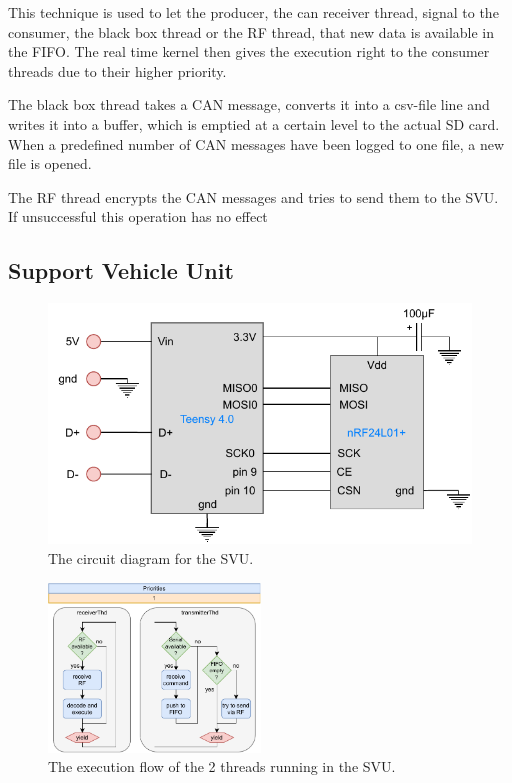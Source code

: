 \documentclass[conference]{IEEEtran}
\begin{document}
This technique is used to let the producer, the can receiver thread, signal to the consumer, the black box thread or the RF thread, that new data is available in the FIFO. The real time kernel then gives the execution right to the consumer threads due to their higher priority.

The black box thread takes a CAN message, converts it into a csv-file line and writes it into a buffer, which is emptied at a certain level to the actual SD card. When a predefined number of CAN messages have been logged to one file, a new file is opened.

The RF thread encrypts the CAN messages and tries to send them to the SVU. If unsuccessful this operation has no effect 





\subsection{Support Vehicle Unit}
\begin{figure}
    \centering
    \includegraphics[width=\linewidth]{documentation/images/SVU_CircuitDiagram.pdf}
    \caption{The circuit diagram for the SVU.}
    \label{fig:SVU_circuit}
\end{figure}
\begin{figure}
    \centering
    \includegraphics[height=4.5cm]{documentation/images/SVU_threads.pdf}
    \caption{The execution flow of the 2 threads running in the SVU.}
    \label{fig:SVU_threads}
\end{figure}
\end{document}
